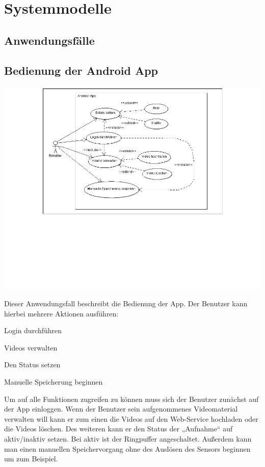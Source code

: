 \section{Systemmodelle}
\subsection{Anwendungsfälle}
\subsection{Bedienung der Android App}
\begin{center}
\includegraphics[width=1\textwidth]{subtopicsFuncspec/systemModels/AppAWFDiagram.png}
\end{center}
Dieser Anwendungsfall beschreibt die Bedienung der App. 
Der Benutzer kann hierbei mehrere Aktionen ausführen:
\begin{description}
\item Login durchführen
\item Videos verwalten
\item Den Status setzen
\item Manuelle Speicherung beginnen
\end{description}
Um auf alle Funktionen zugreifen zu können muss sich der Benutzer zunächst auf der App einloggen. 
Wenn der Benutzer sein aufgenommenes Videomaterial verwalten will kann er zum einen die Videos auf den Web-Service hochladen oder die Videos löschen.
Des weiteren kann er den Status der „Aufnahme“ auf aktiv/inaktiv setzen. Bei aktiv ist der Ringpuffer angeschaltet. 
Außerdem kann man einen manuellen Speichervorgang ohne des Auslösen des Sensors beginnen um zum Beispiel.

